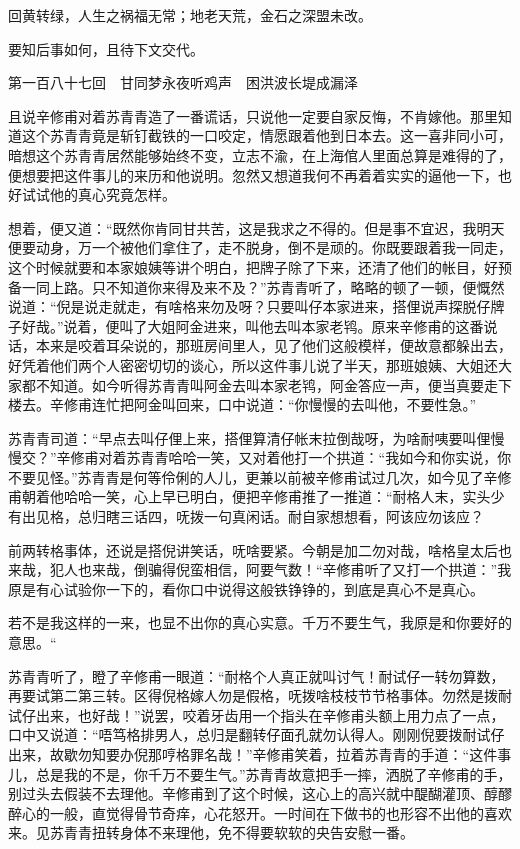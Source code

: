 \documentclass[12pt,UTF8]{ctexbook}
\begin{document}
{{{回黄转绿，人生之祸福无常；地老天荒，金石之深盟未改。

要知后事如何，且待下文交代。





第一百八十七回　甘同梦永夜听鸡声　困洪波长堤成漏泽





且说辛修甫对着苏青青造了一番谎话，只说他一定要自家反悔，不肯嫁他。那里知道这个苏青青竟是斩钉截铁的一口咬定，情愿跟着他到日本去。这一喜非同小可，暗想这个苏青青居然能够始终不变，立志不渝，在上海倌人里面总算是难得的了，便想要把这件事儿的来历和他说明。忽然又想道我何不再着着实实的逼他一下，也好试试他的真心究竟怎样。

想着，便又道：“既然你肯同甘共苦，这是我求之不得的。但是事不宜迟，我明天便要动身，万一个被他们拿住了，走不脱身，倒不是顽的。你既要跟着我一同走，这个时候就要和本家娘姨等讲个明白，把牌子除了下来，还清了他们的帐目，好预备一同上路。只不知道你来得及来不及？”苏青青听了，略略的顿了一顿，便慨然说道：“倪是说走就走，有啥格来勿及呀？只要叫仔本家进来，搭俚说声探脱仔牌子好哉。”说着，便叫了大姐阿金进来，叫他去叫本家老鸨。原来辛修甫的这番说话，本来是咬着耳朵说的，那班房间里人，见了他们这般模样，便故意都躲出去，好凭着他们两个人密密切切的谈心，所以这件事儿说了半天，那班娘姨、大姐还大家都不知道。如今听得苏青青叫阿金去叫本家老鸨，阿金答应一声，便当真要走下楼去。辛修甫连忙把阿金叫回来，口中说道：“你慢慢的去叫他，不要性急。”

苏青青司道：“早点去叫仔俚上来，搭俚算清仔帐末拉倒哉呀，为啥耐咦要叫俚慢慢交？”辛修甫对着苏青青哈哈一笑，又对着他打一个拱道：“我如今和你实说，你不要见怪。”苏青青是何等伶俐的人儿，更兼以前被辛修甫试过几次，如今见了辛修甫朝着他哈哈一笑，心上早已明白，便把辛修甫推了一推道：“耐格人末，实头少有出见格，总归瞎三话四，呒拨一句真闲话。耐自家想想看，阿该应勿该应？

前两转格事体，还说是搭倪讲笑话，呒啥要紧。今朝是加二勿对哉，啥格皇太后也来哉，犯人也来哉，倒骗得倪蛮相信，阿要气数！“辛修甫听了又打一个拱道：”我原是有心试验你一下的，看你口中说得这般铁铮铮的，到底是真心不是真心。

若不是我这样的一来，也显不出你的真心实意。千万不要生气，我原是和你要好的意思。“

苏青青听了，瞪了辛修甫一眼道：“耐格个人真正就叫讨气！耐试仔一转勿算数，再要试第二第三转。区得倪格嫁人勿是假格，呒拨啥枝枝节节格事体。勿然是拨耐试仔出来，也好哉！”说罢，咬着牙齿用一个指头在辛修甫头额上用力点了一点，口中又说道：“唔笃格排男人，总归是翻转仔面孔就勿认得人。刚刚倪要拨耐试仔出来，故歇勿知要办倪那哼格罪名哉！”辛修甫笑着，拉着苏青青的手道：“这件事儿，总是我的不是，你千万不要生气。”苏青青故意把手一摔，洒脱了辛修甫的手，别过头去假装不去理他。辛修甫到了这个时候，这心上的高兴就中醍醐灌顶、醇醪醉心的一般，直觉得骨节奇痒，心花怒开。一时间在下做书的也形容不出他的喜欢来。见苏青青扭转身体不来理他，免不得要软软的央告安慰一番。

}}}
\end{document}
